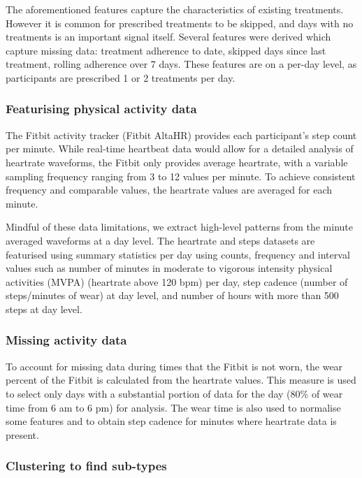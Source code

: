 \documentclass{article}
\begin{document}
The aforementioned features capture the characteristics of existing treatments. However it is common for prescribed treatments to be skipped, and days with no treatments is an important signal itself. Several features were derived which capture missing data: treatment adherence to date, skipped days since last treatment, rolling adherence over 7 days. These features are on a per-day level, as participants are prescribed 1 or 2 treatments per day. 


\subsubsection{Featurising physical activity data}
The Fitbit activity tracker (Fitbit AltaHR) provides each participant’s step count per minute. While real-time heartbeat data would allow for a detailed analysis of heartrate waveforms, the Fitbit only provides average heartrate, with a variable sampling frequency ranging from 3 to 12 values per minute. To achieve consistent frequency and comparable values, the heartrate values are averaged for each minute.   

Mindful of these data limitations, we extract high-level patterns from the minute averaged waveforms at a day level. The heartrate and steps datasets are featurised using summary statistics per day using counts, frequency and interval values such as number of minutes in moderate to vigorous intensity physical activities (MVPA) (heartrate above 120 bpm) per day, step cadence (number of steps/minutes of wear) at day level, and number of hours with more than 500 steps at day level. 


\subsubsection{Missing activity data}

To account for missing data during times that the Fitbit is not worn, the wear percent of the Fitbit is calculated from the heartrate values. This measure is used to select only days with a substantial portion of data for the day (80\% of wear time from 6 am to 6 pm) for analysis. The wear time is also used to normalise some features and to obtain step cadence for minutes where heartrate data is present. 

\subsubsection{Clustering to find sub-types}  
\end{document}
